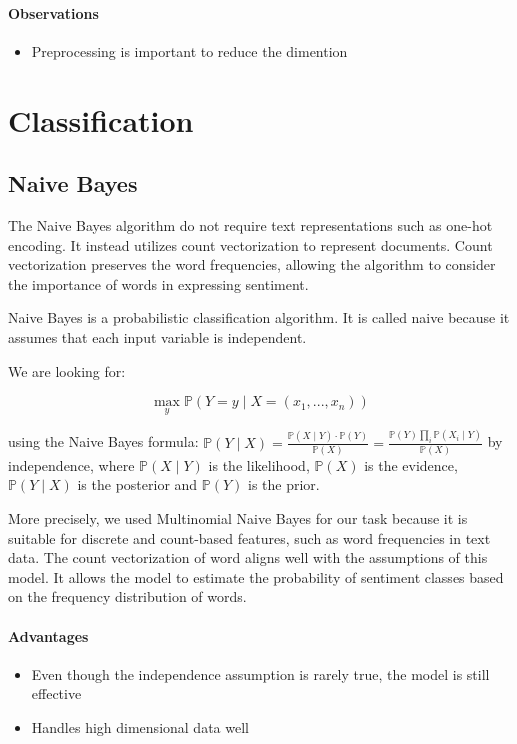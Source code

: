 \documentclass{article}
\begin{document}
\paragraph{Observations}
\begin{itemize}
  \item Preprocessing is important to reduce the dimention
\end{itemize}

\section{Classification}

\subsection{Naive Bayes}

The Naive Bayes algorithm do not require text representations such as one-hot encoding. It instead utilizes count vectorization to represent documents. Count vectorization preserves the word frequencies, allowing the algorithm to consider the importance of words in expressing sentiment.

Naive Bayes is a probabilistic classification algorithm.
It is called naive because it assumes that each input variable is independent.

We are looking for:

$$ \max_{y}\mathbb{P}(Y =y \mid X=(x_1, ..., x_n)) $$

using the Naive Bayes formula: $\mathbb{P}(Y \mid X) = \frac{\mathbb{P}(X\mid Y)\cdot \mathbb{P}(Y)}{\mathbb{P}(X)} = \frac{\mathbb{P}(Y)\prod_{i}^{}\mathbb{P}(X_i\mid Y)}{\mathbb{P}(X)}$
by independence,
where $\mathbb{P}(X\mid Y)$ is the likelihood, $\mathbb{P}(X)$ is the evidence, $\mathbb{P}(Y \mid X)$ is the posterior and $\mathbb{P}(Y)$ is the prior.

More precisely, we used Multinomial Naive Bayes for our task because it is suitable for discrete and count-based features, such as word frequencies in text data. The count vectorization of word aligns well with the assumptions of this model. It allows the model to estimate the probability of sentiment classes based on the frequency distribution of words.

\paragraph{Advantages} \begin{itemize}
\item Even though the independence assumption is rarely true, the model is still effective
\item Handles high dimensional data well
\end{itemize}
\end{document}
